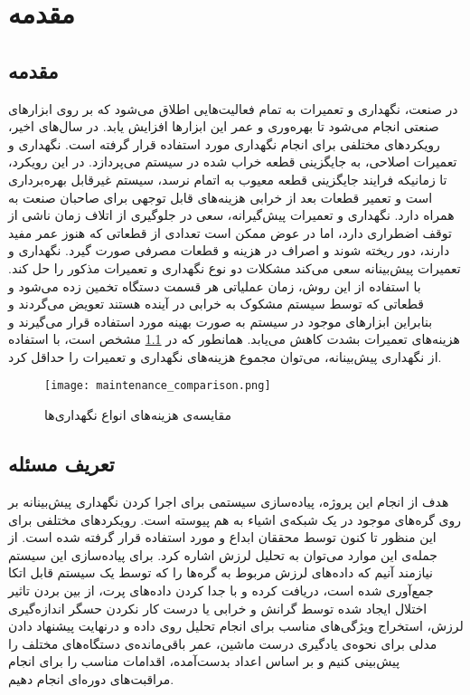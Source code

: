 \chapter{مقدمه}

\section{مقدمه}
در صنعت، نگهداری و تعمیرات به تمام فعالیت‌هایی اطلاق می‌شود که بر روی ابزارهای صنعتی انجام می‌شود تا بهره‌وری و عمر این ابزارها افزایش یابد. در سال‌های اخیر، رویکردهای مختلفی برای انجام نگهداری مورد استفاده قرار گرفته است. نگهداری و تعمیرات اصلاحی، به جایگزینی قطعه خراب شده در سیستم می‌پردازد. در این رویکرد، تا زمانیکه فرایند جایگزینی قطعه معیوب به اتمام نرسد، سیستم غیرقابل بهره‌برداری است و تعمیر قطعات بعد از خرابی هزینه‌های قابل توجهی برای صاحبان صنعت به همراه دارد. نگهداری و تعمیرات پیش‌گیرانه، سعی در جلوگیری از اتلاف زمان ناشی از توقف اضطراری دارد، اما در عوض ممکن است تعدادی از قطعاتی که هنوز عمر مفید دارند، دور ریخته شوند و اصراف در هزینه و قطعات مصرفی صورت گیرد. نگهداری و تعمیرات پیش‌بینانه سعی می‌کند مشکلات دو نوع نگهداری و تعمیرات مذکور را حل کند. با استفاده از این روش، زمان عملیاتی هر قسمت دستگاه تخمین زده می‌شود و قطعاتی که توسط سیستم مشکوک به خرابی در آینده هستند تعویض می‌گردند و بنابراین ابزارهای موجود در سیستم به صورت بهینه مورد استفاده قرار می‌گیرند و هزینه‌های تعمیرات بشدت کاهش می‌یابد. همانطور که در \cref{fig:maintenance_comparison} مشخص است، با استفاده از نگهداری پیش‌بینانه، می‌توان مجموع هزینه‌های نگهداری و تعمیرات را حداقل کرد.

\begin{figure}[!h]
\centerline{\texttt{[image: maintenance\_comparison.png]}}
\caption{مقایسه‌ی هزینه‌های انواع نگهد‌اری‌ها}
\label{fig:maintenance_comparison}
\end{figure}


\section{تعریف مسئله}
هدف از انجام این پروژه، پیاده‌سازی سیستمی برای اجرا کردن نگهداری پیش‌بینانه بر روی گره‌های موجود در یک شبکه‌ی اشیاء به هم پیوسته است. رویکردهای مختلفی برای این منظور تا کنون توسط محققان ابداع و مورد استفاده قرار گرفته شده است. از جمله‌ی این موارد می‌توان به تحلیل لرزش اشاره کرد. برای پیاده‌سازی این سیستم نیازمند آنیم که داده‌های لرزش مربوط به گره‌ها را که توسط یک سیستم قابل اتکا جمع‌آوری شده است، دریافت کرده و با جدا کردن داده‌های پرت، از بین بردن تاثیر اختلال ایجاد شده توسط گرانش و خرابی یا درست‌ کار نکردن حسگر اندازه‌گیری لرزش، استخراج ویژگی‌های مناسب برای انجام تحلیل روی داده و درنهایت پیشنهاد دادن مدلی برای نحوه‌ی یادگیری درست ماشین، عمر باقی‌مانده‌ی دستگاه‌های مختلف را پیش‌بینی کنیم و بر اساس اعداد بدست‌آمده، اقدامات مناسب را برای انجام مراقبت‌های دوره‌ای انجام دهیم.


\section{}
